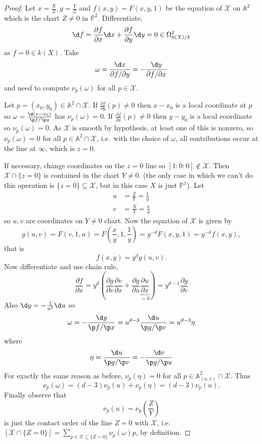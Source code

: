 \documentclass[a4paper]{article}
\renewcommand{\A}{\mathbb{A}}
\renewcommand*{\P}{\mathbb{P}}
\begin{document}
\begin{proof}
  Let \(x = \frac{X}{Z}, y = \frac{Y}{Z}\) and \(f(x, y) = F(x, y, 1)\) be the equation of \(\mathcal X\) on \(\A^2\) which is the chart \(Z \neq 0\) in \(\P^2\). Differentiate,
  \[
    \d f = \frac{\partial f}{\partial x} \d x + \frac{\partial f}{\partial y} \d y = 0 \in \Omega_{k(X)/k}^1
  \]
  as \(f = 0 \in k(X)\). Take
  \[
    \omega = \frac{\d x}{\partial f/\partial y} = - \frac{\d y}{\partial f/\partial x}
  \]
  and need to compute \(\nu_p(\omega)\) for all \(p \in \mathcal X\).

  Let \(p = (x_0, y_0) \in \A^2 \cap \mathcal X\). If \(\frac{\partial f}{\partial y}(p) \neq 0\) then \(x - x_0\) is a local coordinate at \(p\) so \(\omega = \frac{\d(x - x_0)}{\p f/\p y}\) has \(\nu_p(\omega) = 0\). If \(\frac{\partial f}{\partial x}(p) \neq 0\) then \(y - y_0\) is a local coordinate so \(\nu_p(\omega) = 0\). As \(\mathcal X\) is smooth by hypothesis, at least one of this is nonzero, so \(\nu_p(\omega) = 0\) for all \(p \in \A^2 \cap \mathcal X\), i.e.\ with the choice of \(\omega\), all contributions occur at the line at \(\infty\), which is \(z = 0\).

  If necessary, change coordinates on the \(z = 0\) line so \([1:0:0] \notin \mathcal X\). Then \(\mathcal X \cap \{z = 0\}\) is contained in the chart \(Y \neq 0\). (the only case in which we can't do this operation is \(\{z = 0\} \subseteq \mathcal X\), but in this case \(X\) is just \(\P^1\)). Let
  \begin{align*}
    u &= \frac{Z}{Y} = \frac{1}{y} \\
    v &= \frac{X}{Y} = \frac{x}{y}
  \end{align*}
  so \(u, v\) are coordinates on \(Y \neq 0\) chart. Now the equation of \(\mathcal X\) is given by
  \[
    g(u, v) = F(v, 1, u) = F(\frac{x}{y}, 1, \frac{1}{y}) = y^{-d} F(x, y, 1) = y^{-d} f(x, y),
  \]
  that is
  \[
    f(x, y) = y^d g(u, v).
  \]
  Now differentiate and use chain rule,
  \[
    \frac{\partial f}{\partial x}
    = y^d \left( \frac{\partial g}{\partial v} \frac{\partial v}{\partial x} + \frac{\partial g}{\partial u} \underbrace{\frac{\partial u}{\partial x}}_{= 0} \right)
    = y^{d - 1} \frac{\partial g}{\partial v}
  \]
  Also \(\d y = - \frac{1}{u^2} \d u\) so
  \[
    \omega = - \frac{\d y}{\p f/\p x} = u^{d - 3} \frac{\d u}{\p g/\p v} = u^{d - 3} \eta
  \]
  where
  \[
    \eta = \frac{\d u}{\p g/\p v} = - \frac{\d v}{\p g/\p u}
  \]
  For exactly the same reason as before, \(\nu_p(\eta) = 0\) for all \(p \in \A^2_{(u, v)} \cap \mathcal X\). Thus
  \[
    \nu_p(\omega) = (d - 3) \nu_p(u) + \nu_p(\eta) = (d - 3) \nu_p(u).
  \]
  Finally observe that
  \[
    \nu_p(u) = \nu_p(\frac{Z}{Y})
  \]
  is just the contact order of the line \(Z = 0\) with \(\mathcal X\), i.e.\ \([\mathcal X \cap \{Z = 0\}] = \sum_{p \in \mathcal X \subseteq \{Z = 0\}} \nu_p(\omega) p\), by definition.
\end{proof}
\end{document}
